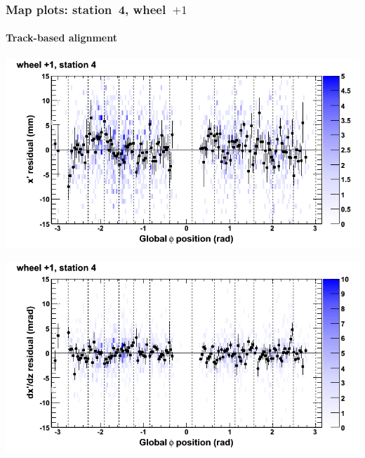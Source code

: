 \documentclass[compress]{beamer}
\begin{document}
\begin{frame}
\frametitle{Map plots: station~4, wheel~$+1$}
\framesubtitle{Track-based alignment}
\includegraphics[width=0.5\linewidth]{mapplots_re05/DTvsphi_st4whD_x.png}

\includegraphics[width=0.5\linewidth]{mapplots_re05/DTvsphi_st4whD_dxdz.png}
\end{frame}
\end{document}
